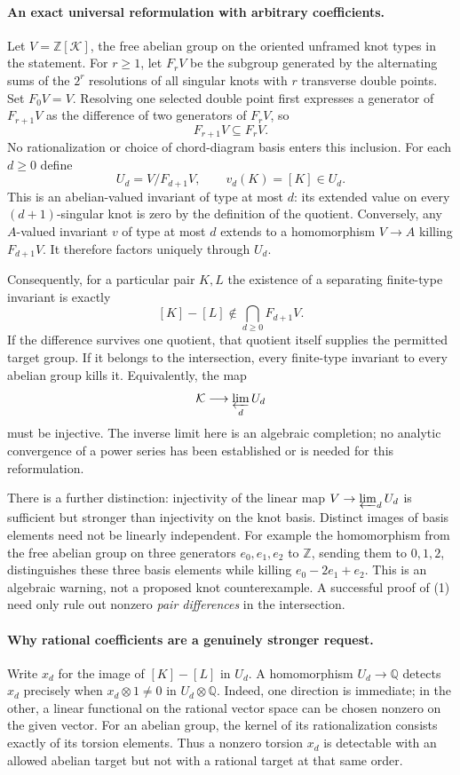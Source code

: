 \documentclass[11pt]{article}
\begin{document}
\paragraph{An exact universal reformulation with arbitrary coefficients.}
Let $V=\mathbb Z[\mathcal K]$, the free abelian group on the oriented
unframed knot types in the statement. For $r\geq1$, let $F_rV$ be the
subgroup generated by the alternating sums of the $2^r$ resolutions of
all singular knots with $r$ transverse double points. Set $F_0V=V$.
Resolving one selected double point first expresses a generator of
$F_{r+1}V$ as the difference of two generators of $F_rV$, so
\[
                   F_{r+1}V\subseteq F_rV.
\]
No rationalization or choice of chord-diagram basis enters this
inclusion. For each $d\geq0$ define
\[
       U_d=V/F_{d+1}V,\qquad v_d(K)=[K]\in U_d.
\]
This is an abelian-valued invariant of type at most $d$: its extended
value on every $(d+1)$-singular knot is zero by the definition of the
quotient. Conversely, any $A$-valued invariant $v$ of type at most $d$
extends to a homomorphism $V\to A$ killing $F_{d+1}V$. It therefore
factors uniquely through $U_d$.

Consequently, for a particular pair $K,L$ the existence of a separating
finite-type invariant is exactly
\[
       [K]-[L]\notin\bigcap_{d\geq0}F_{d+1}V.                 \tag{1}
\]
If the difference survives one quotient, that quotient itself supplies
the permitted target group. If it belongs to the intersection, every
finite-type invariant to every abelian group kills it. Equivalently,
the map
\[
          \mathcal K\longrightarrow\varprojlim_d U_d
\]
must be injective. The inverse limit here is an algebraic completion;
no analytic convergence of a power series has been established or is
needed for this reformulation.

There is a further distinction: injectivity of the linear map
$V\to\varprojlim_dU_d$ is sufficient but stronger than injectivity on
the knot basis. Distinct images of basis elements need not be linearly
independent. For example the homomorphism from the free abelian group on three
generators $e_0,e_1,e_2$ to $\mathbb Z$, sending them to $0,1,2$,
distinguishes these three basis elements while killing
$e_0-2e_1+e_2$. This is an algebraic warning, not a proposed knot
counterexample. A successful proof of (1) need only rule out nonzero
\emph{pair differences} in the intersection.

\paragraph{Why rational coefficients are a genuinely stronger request.}
Write $x_d$ for the image of $[K]-[L]$ in $U_d$. A homomorphism
$U_d\to\mathbb Q$ detects $x_d$ precisely when
$x_d\otimes1\ne0$ in $U_d\otimes\mathbb Q$. Indeed, one direction is
immediate; in the other, a linear functional on the rational vector
space can be chosen nonzero on the given vector. For an abelian group,
the kernel of its rationalization consists exactly of its torsion
elements. Thus a nonzero torsion $x_d$ is detectable with an allowed
abelian target but not with a rational target at that same order.
\end{document}
